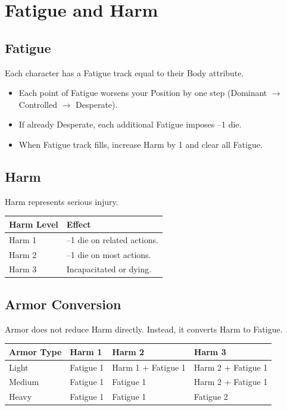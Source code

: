 \documentclass[11pt]{book}
\begin{document}
\section{Fatigue and Harm}

\subsection*{Fatigue}
Each character has a Fatigue track equal to their Body attribute.

\begin{itemize}
  \item Each point of Fatigue worsens your Position by one step (Dominant $\rightarrow$ Controlled $\rightarrow$ Desperate).
  \item If already Desperate, each additional Fatigue imposes --1 die.
  \item When Fatigue track fills, increase Harm by 1 and clear all Fatigue.
\end{itemize}

\subsection*{Harm}
Harm represents serious injury.

\begin{center}
\begin{tabular}{ll}
\toprule
\textbf{Harm Level} & \textbf{Effect} \\
\midrule
Harm 1 & --1 die on related actions. \\
Harm 2 & --1 die on most actions. \\
Harm 3 & Incapacitated or dying. \\
\bottomrule
\end{tabular}
\end{center}

\subsection*{Armor Conversion}
Armor does not reduce Harm directly. Instead, it converts Harm to Fatigue.

\begin{center}
\begin{tabular}{llll}
\toprule
\textbf{Armor Type} & \textbf{Harm 1} & \textbf{Harm 2} & \textbf{Harm 3} \\
\midrule
Light & Fatigue 1 & Harm 1 + Fatigue 1 & Harm 2 + Fatigue 1 \\
Medium & Fatigue 1 & Fatigue 1 & Harm 2 + Fatigue 1 \\
Heavy & Fatigue 1 & Fatigue 1 & Fatigue 2 \\
\bottomrule
\end{tabular}
\end{center}
\end{document}
